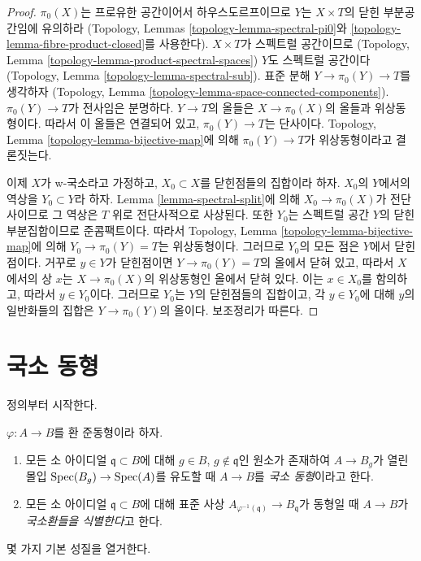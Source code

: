 \begin{proof}
$\pi_0(X)$는 프로유한 공간이어서 하우스도르프이므로
$Y$는 $X \times T$의 닫힌 부분공간임에 유의하라
(Topology, Lemmas \ref{topology-lemma-spectral-pi0}와
\ref{topology-lemma-fibre-product-closed}를 사용한다).
$X \times T$가 스펙트럴 공간이므로
(Topology, Lemma \ref{topology-lemma-product-spectral-spaces})
$Y$도 스펙트럴 공간이다
(Topology, Lemma \ref{topology-lemma-spectral-sub}).
표준 분해 $Y \to \pi_0(Y) \to T$를 생각하자
(Topology, Lemma \ref{topology-lemma-space-connected-components}).
$\pi_0(Y) \to T$가 전사임은 분명하다.
$Y \to T$의 올들은 $X \to \pi_0(X)$의 올들과 위상동형이다.
따라서 이 올들은 연결되어 있고, $\pi_0(Y) \to T$는 단사이다.
Topology, Lemma \ref{topology-lemma-bijective-map}에 의해
$\pi_0(Y) \to T$가 위상동형이라고 결론짓는다.

\medskip\noindent
이제 $X$가 w-국소라고 가정하고, $X_0 \subset X$를
닫힌점들의 집합이라 하자. $X_0$의 $Y$에서의 역상을
$Y_0 \subset Y$라 하자. Lemma \ref{lemma-spectral-split}에 의해
$X_0 \to \pi_0(X)$가 전단사이므로 그 역상은 $T$ 위로 전단사적으로 사상된다.
또한 $Y_0$는 스펙트럴 공간 $Y$의 닫힌 부분집합이므로 준콤팩트이다.
따라서 Topology, Lemma \ref{topology-lemma-bijective-map}에 의해
$Y_0 \to \pi_0(Y) = T$는 위상동형이다.
그러므로 $Y_0$의 모든 점은 $Y$에서 닫힌점이다.
거꾸로 $y \in Y$가 닫힌점이면 $Y \to \pi_0(Y) = T$의 올에서 닫혀 있고,
따라서 $X$에서의 상 $x$는 $X \to \pi_0(X)$의 위상동형인 올에서 닫혀 있다.
이는 $x \in X_0$를 함의하고, 따라서 $y \in Y_0$이다.
그러므로 $Y_0$는 $Y$의 닫힌점들의 집합이고,
각 $y \in Y_0$에 대해 $y$의 일반화들의 집합은
$Y \to \pi_0(Y)$의 올이다. 보조정리가 따른다.
\end{proof}




\section{국소 동형}
\label{section-local-isomorphism}

\noindent
정의부터 시작한다.

\begin{definition}
\label{definition-local-isomorphism}
$\varphi : A \to B$를 환 준동형이라 하자.
\begin{enumerate}
\item 모든 소 아이디얼 $\mathfrak q \subset B$에 대해
$g \in B$, $g \not \in \mathfrak q$인 원소가 존재하여
$A \to B_g$가 열린 몰입 $\mathop{\mathrm{Spec}}(B_g) \to \mathop{\mathrm{Spec}}(A)$를 유도할 때
$A \to B$를 {\it 국소 동형}이라고 한다.
\item 모든 소 아이디얼 $\mathfrak q \subset B$에 대해 표준 사상
$A_{\varphi^{-1}(\mathfrak q)} \to B_\mathfrak q$가 동형일 때
$A \to B$가 {\it 국소환들을 식별한다}고 한다.
\end{enumerate}
\end{definition}
\noindent
몇 가지 기본 성질을 열거한다.

